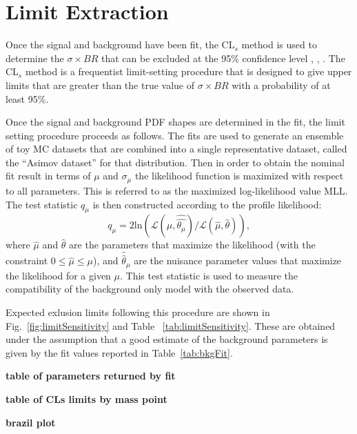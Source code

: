 \section{Limit Extraction}
Once the signal and background have been fit, the CL$_s$ method is used to 
determine the $\sigma\times BR$ that can be excluded at the 95\% confidence
level \cite{CLS1}, \cite{CLS2}, \cite{CLS3}.  The CL$_s$ method is a
frequentist limit-setting procedure that is designed to give upper limits that
are greater than the true value of $\sigma\times BR$ with a probability of at
least 95\%.

Once the signal and background PDF shapes are determined in the fit,
the limit setting procedure proceeds as follows.  The fits are used to generate
an ensemble of toy MC datasets
that are combined into a single representative dataset, called the ``Asimov
dataset'' for that distribution.  Then 
in order to obtain the nominal fit result in terms of $\mu$ and $\sigma_{\mu}$
the likelihood function is maximized with respect to all parameters.
This is referred to as the maximized log-likelihood value MLL.
The test statistic $q_\mu$ is then constructed according to
the profile likelihood:
\begin{equation}
q_\mu = 2 \mathrm{ln} (\mathcal{L} (\mu,
\hat{\hat{\theta_\mu}})/\mathcal{L} (\hat{\mu}, \hat{\theta})), 
\end{equation}
where
$\hat{\mu}$ and $\hat{\theta}$ are the parameters that maximize the
likelihood (with the constraint $0 \leq \hat{\mu} \leq \mu$), and
$\hat{\hat{\theta}}_\mu$ are the nuisance parameter values that maximize the
likelihood for a given $\mu$. This test statistic is used to measure
the compatibility of the background only model with the observed
data. 

Expected exlusion limits following this procedure are shown in Fig.~\ref{fig:limitSensitivity} and Table
~\ref{tab:limitSensitivity}. These are obtained under the assumption that
 a good estimate of the background parameters is given by the fit values reported in Table~\ref{tab:bkgFit}. 

\textbf{table of parameters returned by fit}

\textbf{table of CLs limits by mass point}

\textbf{brazil plot}
